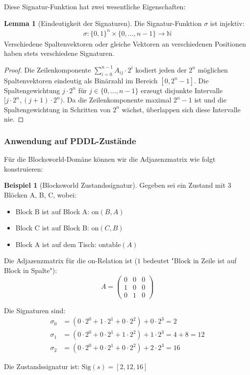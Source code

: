 ﻿\documentclass[a4paper,12pt]{article}
\theoremstyle{definition}
\newtheorem{beispiel}{Beispiel}[section]
\newtheorem{lemma}{Lemma}[section]
\begin{document}
Diese Signatur-Funktion hat zwei wesentliche Eigenschaften:

\begin{lemma}[Eindeutigkeit der Signaturen]
	Die Signatur-Funktion $\sigma$ ist injektiv:
	\begin{align}
	\sigma: \{0,1\}^n \times \{0,\ldots,n-1\} \to \mathbb{N}
	\end{align}
	Verschiedene Spaltenvektoren oder gleiche Vektoren an verschiedenen Positionen haben stets verschiedene Signaturen.
\end{lemma}

\begin{proof}
	Die Zeilenkomponente $\sum_{i=0}^{n-1} A_{ij} \cdot 2^i$ kodiert jeden der $2^n$ möglichen Spaltenvektoren eindeutig als Binärzahl im Bereich $[0, 2^n-1]$. Die Spaltengewichtung $j \cdot 2^n$ für $j \in \{0,\ldots,n-1\}$ erzeugt disjunkte Intervalle $[j \cdot 2^n, (j+1) \cdot 2^n)$. Da die Zeilenkomponente maximal $2^n - 1$ ist und die Spaltengewichtung in Schritten von $2^n$ wächst, überlappen sich diese Intervalle nie.
\end{proof}

\subsubsection{Anwendung auf PDDL-Zustände}

Für die Blocksworld-Domäne können wir die Adjazenzmatrix wie folgt konstruieren:

\begin{beispiel}[Blocksworld Zustandssignatur]
	Gegeben sei ein Zustand mit 3 Blöcken A, B, C, wobei:
	\begin{itemize}
		\item[-] Block B ist auf Block A: $\text{on}(B, A)$
		\item[-] Block C ist auf Block B: $\text{on}(C, B)$
		\item[-] Block A ist auf dem Tisch: $\text{ontable}(A)$
	\end{itemize}
	
	Die Adjazenzmatrix für die on-Relation ist ($1$ bedeutet "Block in Zeile ist auf Block in Spalte"):
	\[
	A = \begin{pmatrix}
	0 & 0 & 0 \\
	1 & 0 & 0 \\
	0 & 1 & 0
	\end{pmatrix}
	\]
	
	Die Signaturen sind:
	\begin{align*}
	\sigma_0 &= (0 \cdot 2^0 + 1 \cdot 2^1 + 0 \cdot 2^2) + 0 \cdot 2^3 = 2 \\
	\sigma_1 &= (0 \cdot 2^0 + 0 \cdot 2^1 + 1 \cdot 2^2) + 1 \cdot 2^3 = 4 + 8 = 12 \\
	\sigma_2 &= (0 \cdot 2^0 + 0 \cdot 2^1 + 0 \cdot 2^2) + 2 \cdot 2^3 = 16
	\end{align*}
	
	Die Zustandssignatur ist: $\text{Sig}(s) = [2, 12, 16]$
\end{beispiel}
\end{document}
